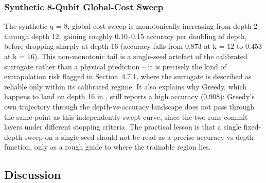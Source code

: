 \subsubsection{Synthetic 8-Qubit Global-Cost Sweep}
The synthetic q = 8, global-cost sweep is monotonically increasing from depth 2 through depth 12, gaining roughly 0.10--0.15 accuracy per doubling of depth, before dropping sharply at depth 16 (accuracy falls from 0.873 at k = 12 to 0.453 at k = 16). This non-monotonic tail is a single-seed artefact of the calibrated surrogate rather than a physical prediction -- it is precisely the kind of extrapolation risk flagged in Section~4.7.1, where the surrogate is described as reliable only within its calibrated regime. It also explains why Greedy, which happens to land on depth 16 in , still reports a high accuracy (0.908): Greedy's own trajectory through the depth-vs-accuracy landscape does not pass through the same point as this independently swept curve, since the two runs commit layers under different stopping criteria. The practical lesson is that a single fixed-depth sweep on a single seed should not be read as a precise accuracy-vs-depth function, only as a rough guide to where the trainable region lies.

\subsection{Discussion}

